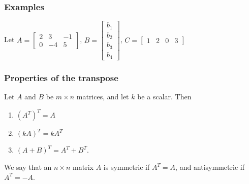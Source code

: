 \documentclass[12pt,t]{beamer}
\begin{document}
\begin{frame}\frametitle{Examples}
 Let $A = \begin{bmatrix}2&3&-1\\0&-4&5\end{bmatrix}$, $B = \begin{bmatrix}b_1\\b_2\\b_3\\b_4\end{bmatrix}$, $C = \begin{bmatrix}1&2&0&3\end{bmatrix}$
\end{frame}
\begin{frame}\frametitle{Properties of the transpose}
 Let $A$ and $B$ be $m\times n$ matrices, and let $k$ be a scalar. Then
\begin{enumerate}
 \item $(A^T)^T = A$
 \item $(kA)^T = kA^T$
 \item $(A+B)^T = A^T+B^T$.
\end{enumerate}
\begin{definition}
 We say that an $n\times n$ matrix $A$ is \alert{symmetric} if $A^T=A$, and \alert{antisymmetric} if $A^T = -A$.
\end{definition}
\end{frame}
\end{document}
